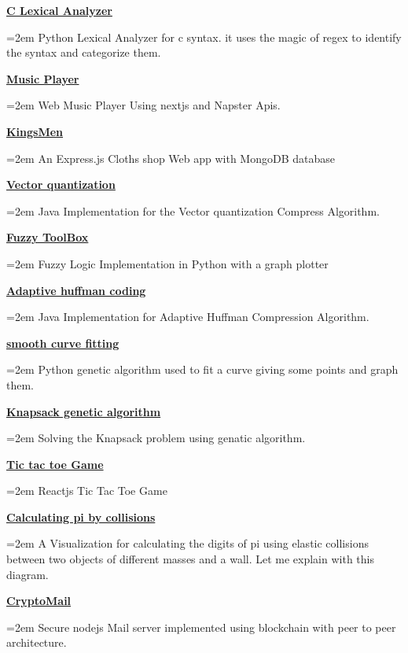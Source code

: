 \documentclass[paper=a4,fontsize=11pt]{scrartcl} %
\newcommand{\ProjectEntry}[2]{
		\noindent \textbf{#1} \hfill      %
		
		\noindent\hangindent=2em\hangafter=0 \small #2 %
		\normalsize \par}
\begin{document}
{\ProjectEntry{\href{https://github.com/peter44322/lexical-analyzer}{C Lexical Analyzer}}{
Python Lexical Analyzer for c syntax. it uses the magic of regex to identify the syntax and categorize them.
}


\ProjectEntry{\href{https://github.com/peter44322/react-songs-app}{Music Player}}{
Web Music Player Using nextjs and Napster Apis.
}

\ProjectEntry{\href{https://github.com/peter44322/KingsMen}{KingsMen}}{
An Express.js Cloths shop Web app with MongoDB database
}

\ProjectEntry{\href{https://github.com/peter44322/vector-quantization}{Vector quantization}}{
Java Implementation for the Vector quantization Compress Algorithm.
}

\ProjectEntry{\href{https://github.com/peter44322/FuzzyToolBox}{Fuzzy ToolBox}}{
Fuzzy Logic Implementation in Python with a graph plotter
}

\ProjectEntry{\href{https://github.com/peter44322/adaptive-huffman-coding}{Adaptive huffman coding}}{
Java Implementation for Adaptive Huffman Compression Algorithm.}

\ProjectEntry{\href{https://github.com/peter44322/smooth-curve-fitting-genetic-algorithm}{smooth curve fitting}}{
Python genetic algorithm used to fit a curve giving some points and graph them.}

\ProjectEntry{\href{https://github.com/peter44322/Knapsack-genetic-algorithm}{Knapsack genetic algorithm}}{Solving the Knapsack problem using genatic algorithm.}


\ProjectEntry{\href{https://github.com/peter44322/reactjs-tic-tac-toe}{Tic tac toe Game}}{Reactjs Tic Tac Toe Game}



\ProjectEntry{\href{https://github.com/peter44322/calculating-pi-by-collision}{Calculating pi by collisions}}{A Visualization for calculating the digits of pi using elastic collisions between two objects of different masses and a wall. Let me explain with this diagram.}

\ProjectEntry{\href{https://github.com/peter44322/CryptoMail}{CryptoMail}}{Secure nodejs Mail server implemented using blockchain with peer to peer architecture.}

}
\end{document}
